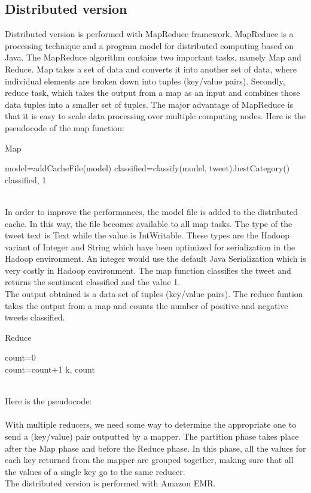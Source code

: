 \documentclass[10pt,twocolumn,letterpaper]{article}
\begin{document}
\subsection{Distributed version}
Distributed version is performed with MapReduce framework. MapReduce is a processing technique and a program model for distributed computing based on Java. The MapReduce algorithm contains two important tasks, namely Map and Reduce.  Map takes a set of data and converts it into another set of data, where individual elements are broken down into tuples (key/value pairs). Secondly, reduce task, which takes the output from a map as an input and combines those data tuples into a smaller set of tuples. The major advantage of MapReduce is that it is easy to scale data processing over multiple computing nodes. Here is the pseudocode of the map function:\\
\begin{algorithm}
\label{Map}
\caption{Map}
\begin{algorithmic}
\State model=addCacheFile(model)
\State classified=classify(model, tweet).bestCategory()
\State \Return classified, 1
\end{algorithmic}
\end{algorithm} \\
In order to improve the performances, the model file is added to the distributed cache. In this way, the file becomes available to all map tasks. The type of the tweet text is Text while the value is IntWritable. These types are the Hadoop variant of Integer and String which have been optimized for serialization in the Hadoop environment. An integer would use the default Java Serialization which is very costly in Hadoop environment. The map function classifies the tweet and returns the sentiment classified and the value 1.\\
The output obtained is a data set of tuples (key/value pairs). The reduce funtion takes the output from a map and counts the number of positive and negative tweets classified.
\begin{algorithm}
\label{Reduce}
\caption{Reduce}
\begin{algorithmic}
\State count=0
    	 \do \\
		\State count=count+1
	\EndFor 
\State \Return k, count
\end{algorithmic}
\end{algorithm} \\
Here is the pseudocode:\\ \\
With multiple reducers, we need some way to determine the appropriate one to send a (key/value) pair outputted by a mapper. The partition phase takes place after the Map phase and before the Reduce phase. In this phase, all the values for each key returned from the mapper are grouped together, making sure that all the values of a single key go to the same reducer.
\\The distributed version is performed with Amazon EMR.
\end{document}
